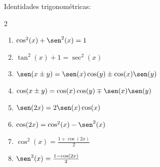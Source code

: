 \documentclass{article}
\begin{document}

Identidades trigonométricas:
\begin{multicols}{2}
  \begin{enumerate}
    \item $\cos^2(x)+\sen^2(x)=1$
    \item $\tan^2(x)+1=\sec^2(x)$
    \item $\sen(x\pm y)=\sen(x)\cos(y)\pm\cos(x)\sen(y)$
    \item $\cos(x\pm y)=\cos(x)\cos(y)\mp\sen(x)\sen(y)$
    \item $\sen(2x)=2\sen(x)\cos(x)$
    \item $\cos(2x)=\cos^2(x)-\sen^2(x)$
    \item $\cos^2(x)=\frac{1+\cos(2x)}{2}$
    \item $\sen^2(x)=\frac{1-\cos(2x)}{2}$
  \end{enumerate}
\end{multicols}
\end{document}
